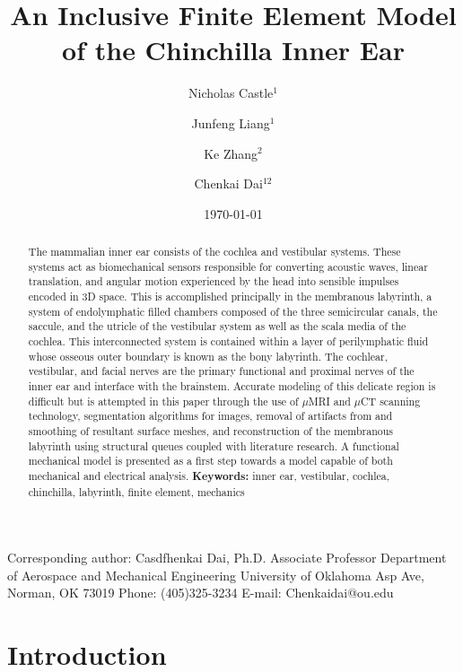 \documentclass[12pt]{article}
\title{\textbf{An Inclusive Finite Element Model of the Chinchilla Inner Ear}}
\author{Nicholas Castle$^1$ \and Junfeng Liang$^1$\and Ke Zhang$^2$\and Chenkai Dai$^{12}$}
\institute{$^1$School of Aerospace and Mechanical Engineering \\ $^2$Stephenson School of Biomedical Engineering \\ University of Oklahoma, Norman OK 73019}
\date{\today}
\begin{document}
\maketitle

\noindent Corresponding author: \newline
Casdfhenkai Dai, Ph.D. \newline
Associate Professor \newline
Department of Aerospace and Mechanical Engineering \newline
University of Oklahoma  Asp Ave, \newline
Norman, OK 73019 \newline
Phone: (405)325-3234 \newline
E-mail: Chenkaidai@ou.edu \newline


\begin{abstract}
The mammalian inner ear consists of the cochlea and vestibular systems. These systems act as biomechanical sensors responsible for converting acoustic waves, linear translation, and angular motion experienced by the head into sensible impulses encoded in 3D space. This is accomplished principally in the membranous labyrinth, a system of endolymphatic filled chambers composed of the three semicircular canals, the saccule, and the utricle of the vestibular system as well as the scala media of the cochlea. This interconnected system is contained within a layer of perilymphatic fluid whose osseous outer boundary is known as the bony labyrinth. The cochlear, vestibular, and facial nerves are the primary functional and proximal nerves of the inner ear and interface with the brainstem. Accurate modeling of this delicate region is difficult but is attempted in this paper through the use of $\mu$MRI and $\mu$CT scanning technology, segmentation algorithms for images, removal of artifacts from and smoothing of resultant surface meshes, and reconstruction of the membranous labyrinth using structural queues coupled with literature research. A functional mechanical model is presented as a first step towards a model capable of both mechanical and electrical analysis. \newline \newline \textbf{Keywords:} inner ear, vestibular, cochlea, chinchilla, labyrinth, finite element, mechanics
\end{abstract}


\section{Introduction}
\end{document}
